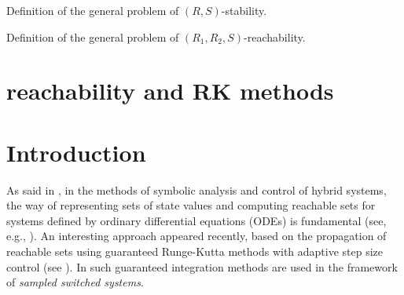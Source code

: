 Definition of the general problem of $(R,S)$-stability. 

Definition of the general problem of $(R_1,R_2,S)$-reachability. 



\section{reachability and RK methods}

\section{Introduction}
As said in \cite{NL_minimator},
in the methods of symbolic analysis and control of
hybrid systems, the way of representing sets of state values
and computing reachable sets for systems defined by
ordinary differential equations (ODEs) is fundamental
(see, e.g., \cite{Althoff2013a,girard2005reachability}).
An interesting approach appeared recently, based on the
propagation of reachable sets using guaranteed Runge-Kutta
methods with adaptive step size control (see \cite{BMC12,immler2015verified}). In
\cite{NL_minimator} such guaranteed
integration methods are used in the framework of {\em sampled switched systems}.

